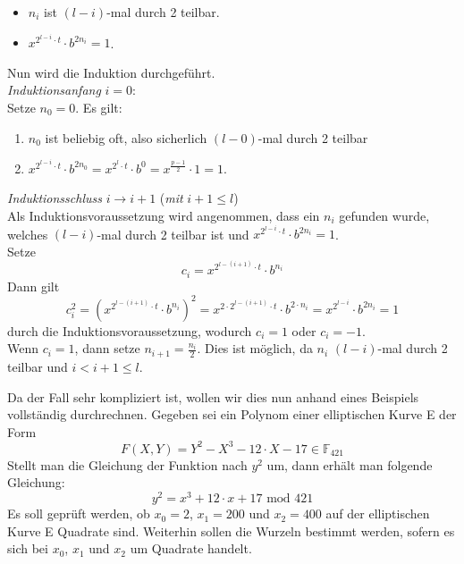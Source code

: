 \begin{itemize}
\item $n_i$ ist $(l - i)$-mal durch 2 teilbar.
\item $x^{2^{l - i} \cdot t} \cdot b^{2n_i} = 1$.
\end{itemize}

Nun wird die Induktion durchgeführt.\\

\textit{Induktionsanfang} $i = 0$:\\Setze $n_0 = 0$. Es gilt:

\begin{enumerate}
\item $n_0$ ist beliebig oft, also sicherlich $(l - 0)$-mal durch 2 teilbar
\item $x^{2^{l - i} \cdot t} \cdot b^{2n_0} = x^{2^{l} \cdot t} \cdot b^0 = x^{\frac{p - 1}{2}} \cdot 1 = 1$.
\end{enumerate}

\textit{Induktionsschluss} $i \rightarrow i + 1$ (\textit{mit} $i + 1 \leq l$)\\Als Induktionsvoraussetzung wird angenommen, dass ein $n_i$ gefunden wurde, welches $(l - i)$-mal durch 2 teilbar ist und $x^{2^{l - i} \cdot t} \cdot b^{2n_i} = 1$.\\Setze $$c_i = x^{2^{l - (i + 1)} \cdot t} \cdot b^{n_i}$$ Dann gilt $$c^2_i = {(x^{2^{l - (i + 1)} \cdot t} \cdot b^{n_i})}^2 = x^{2 \cdot 2^{l - (i + 1)} \cdot t} \cdot b^{2 \cdot n_i} = x^{2^{l - i}} \cdot b^{2n_i} = 1$$ durch die Induktionsvoraussetzung, wodurch $c_i = 1$ oder $c_i = - 1$.\\Wenn $c_i = 1$, dann setze $n_{i + 1} = \frac{n_i}{2}$. Dies ist möglich, da $n_i$ $(l - i)$-mal durch 2 teilbar und $i < i + 1 \leq l$. 











Da der Fall sehr kompliziert ist, wollen wir dies nun anhand eines Beispiels vollständig durchrechnen. Gegeben sei ein Polynom einer elliptischen Kurve E der Form $$F(X, Y) = Y^{2} - X^{3} - 12 \cdot X - 17 \in \mathbb{F}_{421}$$ Stellt man die Gleichung der Funktion nach $y^{2}$ um, dann erhält man folgende Gleichung: $$y^{2} =  x^{3} + 12 \cdot x + 17 \text{ mod }421$$ Es soll geprüft werden, ob $x_0 = 2$, $x_1 = 200$ und $x_2 = 400$ auf der elliptischen Kurve E Quadrate sind. Weiterhin sollen die Wurzeln bestimmt werden, sofern es sich bei $x_0$, $x_1$ und $x_2$ um Quadrate handelt.\\

